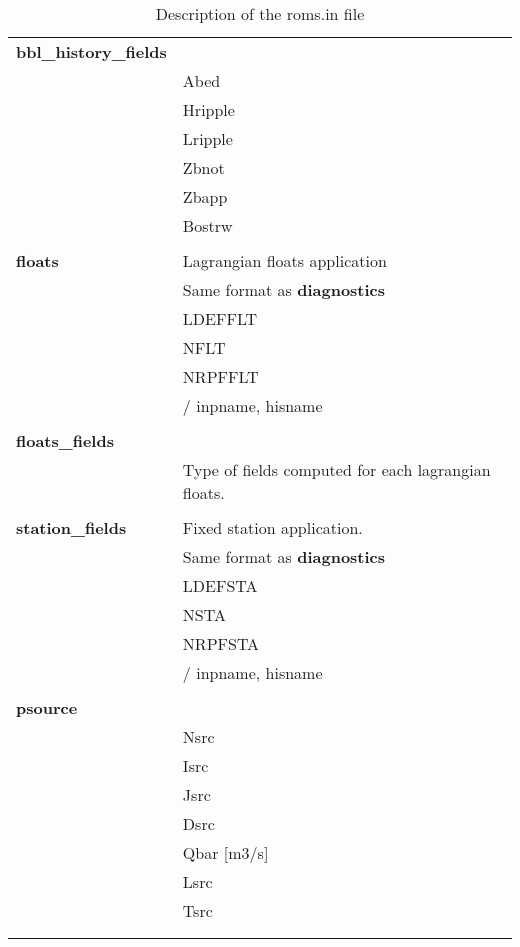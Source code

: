 \begin{longtable}{|p{0.25\linewidth}|p{0.75\linewidth}|}
\large{\textbf{bbl\_history\_fields}} &     \\
& Abed  \\
& Hripple  \\
& Lripple  \\
& Zbnot  \\
& Zbapp  \\
& Bostrw \\
&  \\ 

\large{\textbf{floats}} & Lagrangian floats application \\
& Same format as \large{\textbf{diagnostics}}  \\
& LDEFFLT \\
& NFLT \\
& NRPFFLT  \\
& / inpname, hisname \\
&  \\ 

\large{\textbf{floats\_fields}} &     \\
& Type of fields computed for each lagrangian floats. \\
&  \\ 

\large{\textbf{station\_fields}} &  Fixed station application.   \\
& Same format as \large{\textbf{diagnostics}}  \\
& LDEFSTA \\
& NSTA    \\
& NRPFSTA \\
&/ inpname, hisname \\
&    \\

\large{\textbf{psource}} &     \\
& Nsrc   \\
& Isrc   \\
& Jsrc   \\
& Dsrc   \\
& Qbar [m3/s]   \\  
& Lsrc   \\      
& Tsrc   \\
&  \\ 
\hline
\caption{Description of the roms.in file}
\label{ta:desc_roms.in}
\end{longtable}

